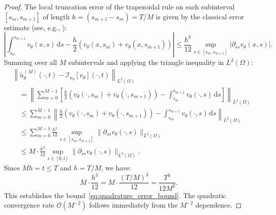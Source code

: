 \documentclass[11pt,reqno]{amsart}
\theoremstyle{plain}
\theoremstyle{definition}
\theoremstyle{remark}
\begin{document}
\begin{proof}
The local truncation error of the trapezoidal rule on each subinterval $[s_m, s_{m+1}]$ of length $h = (s_{m+1} - s_m) = T/M$ is given by the classical error estimate (see, e.g., \cite{atkinson1989}):
\begin{equation}
\left| \int_{s_m}^{s_{m+1}} v_\theta(x,s) \, \mathrm{d}s - \frac{h}{2}\left(v_\theta(x,s_m) + v_\theta(x,s_{m+1})\right) \right| 
\leq \frac{h^3}{12} \sup_{s \in [s_m, s_{m+1}]} |\partial_{ss} v_\theta(x,s)|.
\end{equation}
Summing over all $M$ subintervals and applying the triangle inequality in $L^2(\Omega)$:
\begin{align}
&\left\|\tilde{u}_\theta^{(M)}(\cdot,t) - \mathcal{I}_{u_0}[v_\theta](\cdot,t)\right\|_{L^2(\Omega)} \\
&\quad= \left\| \sum_{m=0}^{M-1} \left[ \frac{h}{2}\left(v_\theta(\cdot,s_m) + v_\theta(\cdot,s_{m+1})\right) - \int_{s_m}^{s_{m+1}} v_\theta(\cdot,s) \, \mathrm{d}s \right] \right\|_{L^2(\Omega)} \\
&\quad\leq \sum_{m=0}^{M-1} \left\| \frac{h}{2}\left(v_\theta(\cdot,s_m) + v_\theta(\cdot,s_{m+1})\right) - \int_{s_m}^{s_{m+1}} v_\theta(\cdot,s) \, \mathrm{d}s \right\|_{L^2(\Omega)} \\
&\quad\leq \sum_{m=0}^{M-1} \frac{h^3}{12} \sup_{s \in [s_m, s_{m+1}]} \|\partial_{ss} v_\theta(\cdot, s)\|_{L^2(\Omega)} \\
&\quad\leq M \cdot \frac{h^3}{12} \sup_{s \in [0,t]} \|\partial_{ss} v_\theta(\cdot, s)\|_{L^2(\Omega)}.
\end{align}
Since $Mh = t \leq T$ and $h = T/M$, we have:
\begin{equation}
M \cdot \frac{h^3}{12} = M \cdot \frac{(T/M)^3}{12} = \frac{T^3}{12M^2}.
\end{equation}
This establishes the bound~\eqref{eq:quadrature_error_bound}. The quadratic convergence rate $\mathcal{O}(M^{-2})$ follows immediately from the $M^{-2}$ dependence.
\end{proof}
\end{document}
